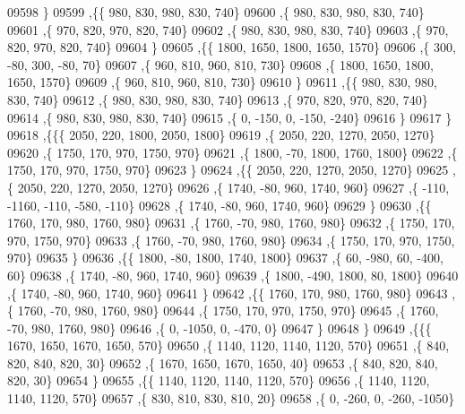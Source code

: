 \begin{DoxyCode}
09598     \}
09599    ,\{\{   980,   830,   980,   830,   740\}
09600     ,\{   980,   830,   980,   830,   740\}
09601     ,\{   970,   820,   970,   820,   740\}
09602     ,\{   980,   830,   980,   830,   740\}
09603     ,\{   970,   820,   970,   820,   740\}
09604     \}
09605    ,\{\{  1800,  1650,  1800,  1650,  1570\}
09606     ,\{   300,   -80,   300,   -80,    70\}
09607     ,\{   960,   810,   960,   810,   730\}
09608     ,\{  1800,  1650,  1800,  1650,  1570\}
09609     ,\{   960,   810,   960,   810,   730\}
09610     \}
09611    ,\{\{   980,   830,   980,   830,   740\}
09612     ,\{   980,   830,   980,   830,   740\}
09613     ,\{   970,   820,   970,   820,   740\}
09614     ,\{   980,   830,   980,   830,   740\}
09615     ,\{     0,  -150,     0,  -150,  -240\}
09616     \}
09617    \}
09618   ,\{\{\{  2050,   220,  1800,  2050,  1800\}
09619     ,\{  2050,   220,  1270,  2050,  1270\}
09620     ,\{  1750,   170,   970,  1750,   970\}
09621     ,\{  1800,   -70,  1800,  1760,  1800\}
09622     ,\{  1750,   170,   970,  1750,   970\}
09623     \}
09624    ,\{\{  2050,   220,  1270,  2050,  1270\}
09625     ,\{  2050,   220,  1270,  2050,  1270\}
09626     ,\{  1740,   -80,   960,  1740,   960\}
09627     ,\{  -110, -1160,  -110,  -580,  -110\}
09628     ,\{  1740,   -80,   960,  1740,   960\}
09629     \}
09630    ,\{\{  1760,   170,   980,  1760,   980\}
09631     ,\{  1760,   -70,   980,  1760,   980\}
09632     ,\{  1750,   170,   970,  1750,   970\}
09633     ,\{  1760,   -70,   980,  1760,   980\}
09634     ,\{  1750,   170,   970,  1750,   970\}
09635     \}
09636    ,\{\{  1800,   -80,  1800,  1740,  1800\}
09637     ,\{    60,  -980,    60,  -400,    60\}
09638     ,\{  1740,   -80,   960,  1740,   960\}
09639     ,\{  1800,  -490,  1800,    80,  1800\}
09640     ,\{  1740,   -80,   960,  1740,   960\}
09641     \}
09642    ,\{\{  1760,   170,   980,  1760,   980\}
09643     ,\{  1760,   -70,   980,  1760,   980\}
09644     ,\{  1750,   170,   970,  1750,   970\}
09645     ,\{  1760,   -70,   980,  1760,   980\}
09646     ,\{     0, -1050,     0,  -470,     0\}
09647     \}
09648    \}
09649   ,\{\{\{  1670,  1650,  1670,  1650,   570\}
09650     ,\{  1140,  1120,  1140,  1120,   570\}
09651     ,\{   840,   820,   840,   820,    30\}
09652     ,\{  1670,  1650,  1670,  1650,    40\}
09653     ,\{   840,   820,   840,   820,    30\}
09654     \}
09655    ,\{\{  1140,  1120,  1140,  1120,   570\}
09656     ,\{  1140,  1120,  1140,  1120,   570\}
09657     ,\{   830,   810,   830,   810,    20\}
09658     ,\{     0,  -260,     0,  -260, -1050\}

\end{DoxyCode}
